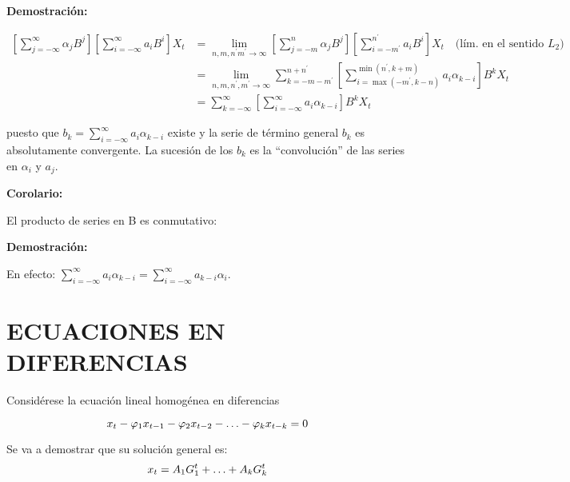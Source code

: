 \textbf{Demostraci\'{o}n:}

\begin{align*}
\left[\sum_{j=-\infty}^{\infty} \alpha_{j} B^{j} \right]\left[\sum_{i=-\infty}^{\infty} a_{i} B^{i} \right]X_{t} &= \lim_{n,m,n^{'} m^{'}\to \infty} \left[\sum_{j=-m}^n \alpha_{j}B^{j} \right]\left[\sum_{i=-m^{'}}^{n^{'}} a_{i}B^{i} \right]X_{t}\quad  \text{(l\'{i}m. en el sentido $L_{2}$)}\\
      &= \lim_{n,m,n^{'},m^{'} \to \infty} \sum_{k=-m-m^{'}}^{n+n^{'}} \left[\sum_{i=\max(-m^{'}, k-n)}^{\min (n^{'},k+m)} a_{i} \alpha_{k-i}\right]B^{k}X_{t}\\
      &= \sum_{k=-\infty}^{\infty}\left[\sum_{i=-\infty}^{\infty} a_{i} \alpha_{k-i} \right]B^{k}X_{t}
\end{align*}

puesto que $b_{k} =\displaystyle\sum_{i=-\infty}^{\infty} a_{i}\alpha_{k-i}$ existe y la serie de t\'{e}rmino general $b_{k}$ es absolutamente convergente. La sucesi\'{o}n de los $b_{k}$ es la ``convoluci\'{o}n'' de las series en $\alpha_{i}$ y $a_{j}$.\newline

\textbf{Corolario:}\newline

El producto de series en B es conmutativo:\newline

\textbf{Demostraci\'{o}n:}\newline

En efecto: $\sum\limits_{i=-\infty }^\infty {a_{i} \alpha_{k-i} } =\sum\limits_{i=-\infty }^\infty {a_{k-i} \alpha_{i} } $.\newline

\section{ECUACIONES EN DIFERENCIAS}
Consid\'{e}rese la ecuaci\'{o}n lineal homog\'{e}nea en diferencias

\begin{equation}{
\label{ecu:01}
x_{t} -\varphi_{1} x_{t-1} -\varphi_{2} x_{t-2} -\mathellipsis -\varphi _{k} x_{t-k} =0}
\end{equation}

Se va a demostrar que su soluci\'{o}n general es:
\begin{equation}{
\label{ecu:02}
x_{t} =A_{1} G_{1}^{t} +\mathellipsis +A_{k} G_{k}^{t}}
\end{equation}

